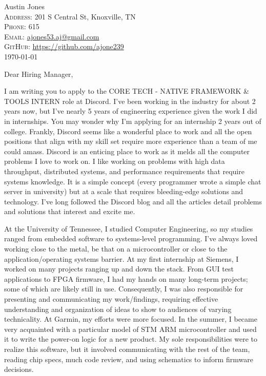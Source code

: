 \documentclass[a4paper,12pt]{article}
\begin{document}
\pagestyle{empty} %


\Huge Austin Jones\smallskip{} \\
\small \textsc{Address:} 201 S Central St, Knoxville, TN \\
\small \textsc{Phone:} 615 \\
\textsc{Email:} \href{mailto:ajones53.aj@gmail.com}{ajones53.aj@gmail.com} \\
\textsc{GitHub:} \href{https://github.com/ajone239}{https://github.com/ajone239} \\

\today

Dear Hiring Manager,

I am writing you to apply to the CORE TECH - NATIVE FRAMEWORK \& TOOLS INTERN role at Discord.
I've been working in the industry for about 2 years now, but I've nearly 5 years of engineering experience given the work I did in internships.
You may wonder why I'm applying for an internship 2 years out of college.
Frankly, Discord seems like a wonderful place to work and all the open positions that align with my skill set require more experience than a team of me could amass.
Discord is an enticing place to work as it melds all the computer problems I love to work on.
I like working on problems with high data throughput, distributed systems, and performance requirements that require systems knowledge.
It is a simple concept (every programmer wrote a simple chat server in university) but at a scale that requires bleeding-edge solutions and technology.
I've long followed the Discord blog and all the articles detail problems and solutions that interest and excite me.

At the University of Tennessee, I studied Computer Engineering, so my studies ranged from embedded software to systems-level programming.
I've always loved working close to the metal, be that on a microcontroller or close to the application/operating systems barrier.
At my first internship at Siemens, I worked on many projects ranging up and down the stack.
From GUI test applications to FPGA firmware, I had my hands on many long-term projects; some of which are likely still in use.
Consequently, I was also responsible for presenting and communicating my work/findings, requiring effective understanding and organization of ideas to show to audiences of varying technicality.
At Garmin, my efforts were more focused.
In the summer, I became very acquainted with a particular model of STM ARM microcontroller and used it to write the power-on logic for a new product.
My sole responsibilities were to realize this software, but it involved communicating with the rest of the team, reading chip specs, much code review, and using schematics to inform firmware decisions.
\end{document}
